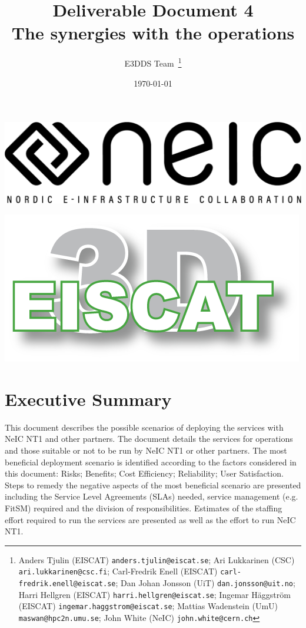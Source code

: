 \documentclass[12pt,a4paper]{article}
\title{
{\bf Deliverable Document 4} \\
The synergies with the \nnt operations}
\author{E3DDS Team~\footnote{
Anders Tjulin (EISCAT) {\tt anders.tjulin@eiscat.se};
Ari Lukkarinen (CSC) {\tt ari.lukkarinen@csc.fi};
Carl-Fredrik Enell (EISCAT) {\tt carl-fredrik.enell@eiscat.se};
Dan Johan Jonsson (UiT) {\tt dan.jonsson@uit.no};
Harri Hellgren (EISCAT) {\tt harri.hellgren@eiscat.se};
Ingemar H\"{a}ggstr\"{o}m (EISCAT) {\tt ingemar.haggstrom@eiscat.se};
Mattias Wadenstein (UmU) {\tt maswan@hpc2n.umu.se};
John White (NeIC) {\tt john.white@cern.ch}}}
\date{\today}
\newcommand{\nnt}{NeIC NT1\xspace}
\begin{document}
\pagestyle{fancy}

\maketitle
\par\noindent
\begin{minipage}{0.5\textwidth}
  \includegraphics[scale=0.18]{NEIC_logo_screen_black.pdf}
\end{minipage}
\begin{minipage}{0.5\textwidth}
  \hfill
  \includegraphics[width=0.75\linewidth]{e3d-logo-green-500px}
\end{minipage}

\newpage
\tableofcontents
\newpage

\section{Executive Summary}
\label{exec-summ}


This document describes the possible scenarios of deploying the \ED \einfra services with \nnt and other partners.
The document details the services for \ED operations and those suitable or not to be run by \nnt or other partners.
The most beneficial deployment scenario is identified according to the factors considered in this document: Risks; Benefits; Cost Efficiency; Reliability; User Satisfaction.
Steps to remedy the negative aspects of the most beneficial scenario are presented including the Service Level Agreements (SLAs) needed, service management (e.g. FitSM) required and the division of responsibilities.  
Estimates of the staffing effort required to run the \ED services are presented as well as the effort to run \nnt. 
\end{document}
